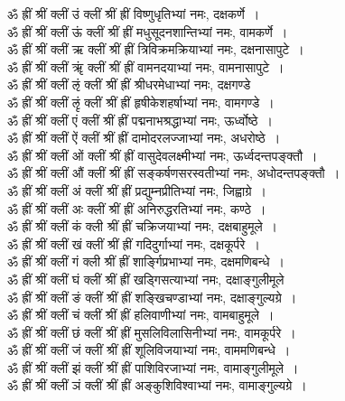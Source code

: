 \documentclass[twoside,top=1.7cm, bottom=1.7cm, outer=1cm,landscape, inner=1.5cm,a5paper,]{book}
\begin{document}
ॐ ह्रीं श्रीं क्लीं उं क्लीं श्रीं ह्रीं विष्णुधृतिभ्यां नमः, दक्षकर्णे~।\\
ॐ ह्रीं श्रीं क्लीं ऊं क्लीं श्रीं ह्रीं मधुसूदनशान्तिभ्यां नमः, वामकर्णे~।\\
ॐ ह्रीं श्रीं क्लीं ऋ क्लीं श्रीं ह्रीं त्रिविक्रमक्रियाभ्यां नमः, दक्षनासापुटे~।\\
ॐ ह्रीं श्रीं क्लीं ॠं क्लीं श्रीं ह्रीं वामनदयाभ्यां नमः, वामनासापुटे~।\\
ॐ ह्रीं श्रीं क्लीं ऌं क्लीं श्रीं ह्रीं श्रीधरमेधाभ्यां नमः, दक्षगण्डे\\
ॐ ह्रीं श्रीं क्लीं ऌृं क्लीं श्रीं ह्रीं हृषीकेशहर्षाभ्यां नमः, वामगण्डे~।\\
ॐ ह्रीं श्रीं क्लीं एं क्लीं श्रीं ह्रीं पद्मनाभश्रद्धाभ्यां नमः, ऊर्ध्वोष्ठे~।\\
ॐ ह्रीं श्रीं क्लीं ऐं क्लीं श्रीं ह्रीं दामोदरलज्जाभ्यां नमः, अधरोष्ठे~।\\
ॐ ह्रीं श्रीं क्लीं ओं क्लीं श्रीं ह्रीं वासुदेवलक्ष्मीभ्यां नमः, ऊर्ध्वदन्तपङ्क्तौ~।\\
ॐ ह्रीं श्रीं क्लीं औं क्लीं श्रीं ह्रीं सङ्कर्षणसरस्वतीभ्यां नमः, अधोदन्तपङ्क्तौ~।\\
ॐ ह्रीं श्रीं क्लीं अं क्लीं श्रीं ह्रीं प्रद्युम्नप्रीतिभ्यां नमः, जिह्वाग्रे~।\\
ॐ ह्रीं श्रीं क्लीं अः क्लीं श्रीं ह्रीं अनिरुद्धरतिभ्यां नमः, कण्ठे~।\\
ॐ ह्रीं श्रीं क्लीं कं क्ली श्रीं ह्रीं चक्रिजयाभ्यां नमः, दक्षबाहुमूले~।\\
ॐ ह्रीं श्रीं क्लीं खं क्लीं श्रीं ह्रीं गदिदुर्गाभ्यां नमः, दक्षकूर्परे~।\\
ॐ ह्रीं श्रीं क्लीं गं क्ली श्रीं ह्रीं शार्ङ्गिप्रभाभ्यां नमः, दक्षमणिबन्धे~।\\
ॐ ह्रीं श्रीं क्लीं घं क्लीं श्रीं ह्रीं खड्गिसत्याभ्यां नमः, दक्षाङ्गुलीमूले\\
ॐ ह्रीं श्रीं क्लीं ङं क्लीं श्रीं ह्रीं शङ्खिचण्डाभ्यां नमः, दक्षाङ्गुल्यग्रे~।\\
ॐ ह्रीं श्रीं क्लीं चं क्लीं श्रीं ह्रीं हलिवाणीभ्यां नमः, वामबाहुमूले~।\\
ॐ ह्रीं श्रीं क्लीं छं क्लीं श्रीं ह्रीं मुसलिविलासिनीभ्यां नमः, वामकूर्परे~।\\
ॐ ह्रीं श्रीं क्लीं जं क्लीं श्रीं ह्रीं शूलिविजयाभ्यां नमः, वाममणिबन्धे~।\\
ॐ ह्रीं श्रीं क्लीं झं क्लीं श्रीं ह्रीं पाशिविरजाभ्यां नमः, वामाङ्गुलीमूले~।\\
ॐ ह्रीं श्रीं क्लीं ञं क्लीं श्रीं ह्रीं अङ्कुशिविश्वाभ्यां नमः, वामाङ्गुल्यग्रे~।\\
\end{document}
